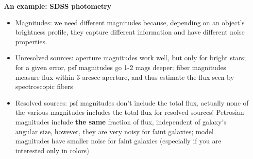 \documentclass[letterpaper,landscape]{slides}
\begin{document}
\begin{slide}
	\begin{center}
		\bfseries
		{\large {\color{red} An example: SDSS photometry}}
	\end{center}
	\vskip 0.6in
	
	\begin{itemize}
		\item {\color{blue} Magnitudes:} we need different magnitudes because, depending
		on an object's brightness profile, they {\color{blue} capture different information} and
		have {\color{blue} different noise properties.}
		\item {\color{blue} Unresolved sources:} {\color{red} aperture magnitudes} work well, but 
		only for bright stars; for a given error, {\color{red} psf magnitudes} go 1-2 mags deeper; 
		{\color{red} fiber magnitudes} measure flux within 3 arcsec aperture, and thus estimate 
		the flux seen by spectroscopic fibers
		\item {\color{blue} Resolved sources:} psf magnitudes don't include the total 
		flux, actually none of the various magnitudes includes the total flux
		for resolved sources! {\color{red} Petrosian magnitudes} include {\bf the same} 
		fraction of flux, independent of galaxy's angular size, however, they are
		very noisy for faint galaxies; {\color{red} model magnitudes} have smaller noise for
		faint galaxies (especially if you are interested only in colors)
	\end{itemize}
	
\end{slide}

\end{document}
